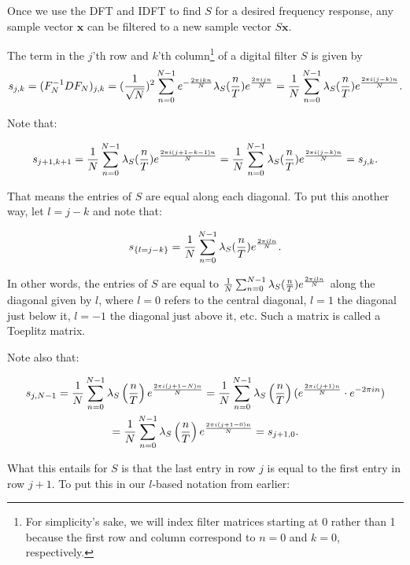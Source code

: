 \par \bigskip Once we use the DFT and IDFT to find $S$ for a desired frequency response, any sample vector $\mathbf{x}$ can be filtered to a new sample vector $S\mathbf{x}$.

\newpage

\begin{example}{The term in the $j$'th row and $k$'th column\footnote{For simplicity's sake, we will index filter matrices starting at 0 rather than 1 because the first row and column correspond to $n=0$ and $k=0$, respectively.} of a digital filter $S$ is given by}
    $$s_{j,k} = (F^{-1}_NDF_N)_{j,k} = (\frac{1}{\sqrt{N}})^2 \sum_{n=0}^{N-1} e^{-\frac{2\pi ikn}{N}} \lambda_S(\frac{n}{T}) e^{\frac{2 \pi i jn}{N}} = \frac{1}{N} \sum_{n=0}^{N-1} \lambda_S(\frac{n}{T}) e^{\frac{2 \pi i (j-k)n}{N}}.$$
    \label{ex:terms_digital_filter}
\end{example}

Note that:

$$s_{j+1,k+1} = \frac{1}{N} \sum_{n=0}^{N-1} \lambda_S(\frac{n}{T}) e^{\frac{2 \pi i (j+1-k-1)n}{N}} = \frac{1}{N} \sum_{n=0}^{N-1} \lambda_S(\frac{n}{T}) e^{\frac{2 \pi i (j-k)n}{N}} = s_{j,k}.$$

\par That means the entries of $S$ are equal along each diagonal. To put this another way, let $l = j-k$ and note that:

$$s_{\{l=j-k\}} = \frac{1}{N} \sum_{n=0}^{N-1} \lambda_S(\frac{n}{T}) e^{\frac{2 \pi i ln}{N}}.$$

\par In other words, the entries of $S$ are equal to $\frac{1}{N} \sum_{n=0}^{N-1} \lambda_S(\frac{n}{T}) e^{\frac{2 \pi i ln}{N}}$ along the diagonal given by $l$, where $l=0$ refers to the central diagonal, $l=1$ the diagonal just below it, $l=-1$ the diagonal just above it, etc. Such a matrix is called a Toeplitz matrix.

\par \bigskip Note also that:

\begin{multline*}
    s_{j,N-1} = \frac{1}{N} \sum_{n=0}^{N-1} \lambda_S\left(\frac{n}{T}\right) e^{\frac{2 \pi i (j+1-N)n}{N}} = \frac{1}{N} \sum_{n=0}^{N-1} \lambda_S\left(\frac{n}{T}\right)(e^{\frac{2 \pi i (j+1)n}{N}}\cdot e^{-2\pi in}) \\= \frac{1}{N} \sum_{n=0}^{N-1} \lambda_S\left(\frac{n}{T}\right)e^{\frac{2 \pi i (j+1-0)n}{N}} = s_{j+1,0}.
\end{multline*}

What this entails for $S$ is that the last entry in row $j$ is equal to the first entry in row $j+1$. To put this in our $l$-based notation from earlier:

